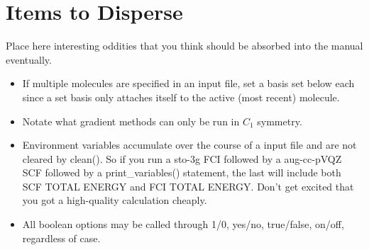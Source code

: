 \section{Items to Disperse} \label{disperse}

Place here interesting oddities that you think should be absorbed into the manual eventually.

\begin{itemize}
\item If multiple molecules are specified in an input file, set a basis set below each since
a set basis only attaches itself to the active (most recent) molecule.
\item Notate what gradient methods can only be run in $C_1$ symmetry.
\item Environment variables accumulate over the course of a input file and are not cleared
by clean(). So if you run a sto-3g FCI followed by a aug-cc-pVQZ SCF followed by a print\_variables()
statement, the last will include both SCF TOTAL ENERGY and FCI TOTAL ENERGY. Don't get excited that
you got a high-quality calculation cheaply.
\item All boolean options may be called through 1/0, yes/no, true/false, on/off, regardless of case.
\end{itemize}


